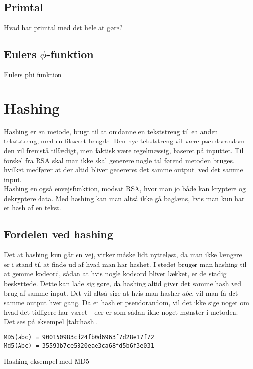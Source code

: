\documentclass[a4paper, 12pt]{article}
\theoremstyle{break}
\begin{document}
    \subsection{Primtal}
    Hvad har primtal med det hele at gøre?

    \subsection{Eulers \texorpdfstring{\(\phi\)}{Lg}-funktion}
    Eulers phi funktion



\section{Hashing}
Hashing er en metode, brugt til at omdanne en tekststreng til en anden tekststreng, med en fikseret længde.
Den nye tekststreng vil være pseudorandom - den vil fremstå tilfædigt, men faktisk være regelmæssig, baseret på inputtet.
Til forskel fra RSA skal man ikke skal generere nogle tal førend metoden bruges, hvilket medfører at der altid bliver genereret det samme output, ved det samme input.
\\
Hashing en også envejsfunktion, modsat RSA, hvor man jo både kan kryptere og dekryptere data.
Med hashing kan man altså ikke gå baglæns, hvis man kun har et hash af en tekst.


    \subsection{Fordelen ved hashing}
    Det at hashing kun går en vej, virker måske lidt nytteløst, da man ikke længere er i stand til at finde ud af hvad man har hashet.
    I stedet bruger man hashing til at gemme kodeord, sådan at hvis nogle kodeord bliver lækket, er de stadig beskyttede.
    Dette kan lade sig gøre, da hashing altid giver det samme hash ved brug af samme input.
    Det vil altså sige at hvis man hasher \(abc\), vil man få det samme output hver gang.
    Da et hash er pseudorandom, vil det ikke sige noget om hvad det tidligere har været - der er som sådan ikke noget mønster i metoden.
    Det ses på eksempel \autoref{tab:hash}.


    \begin{eks}
        \centering
        \texttt{MD5(abc) = 900150983cd24fb0d6963f7d28e17f72}\\
        \texttt{Md5(Abc) = 35593b7ce5020eae3ca68fd5b6f3e031}

        \caption{Hashing eksempel med MD5}
        \label{tab:hash}
    \end{eks}
\end{document}
